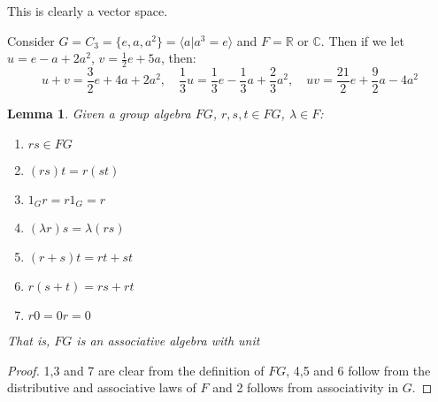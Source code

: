 \documentclass[11pt, notitlepage]{article}
\numberwithin{equation}{section}
\theoremstyle{plain}
\newtheorem{lemma}[theorem]{Lemma}
\theoremstyle{definition}
\newenvironment{example}
	{\pushQED{\qed}\renewcommand{\qedsymbol}{$\blacktriangleleft$}\examplex}
	{\popQED\endexamplex}
\newcommand{\R}{\mathbb{R}}
\newcommand{\C}{\mathbb{C}}
\begin{document}
This is clearly a vector space.

\begin{example}
	Consider $G = C_3 = \{e,a,a^2\} = \langle a|a^3=e\rangle$ and $F=\R$ or $\C$. Then if we let $u = e-a+2a^2$, $v=\frac{1}{2}e+5a$, then:
	\[u+v = \frac{3}{2}e+4a+2a^2,\quad \frac{1}{3}u = \frac{1}{3}e-\frac{1}{3}a+\frac{2}{3}a^2,\quad uv = \frac{21}{2}e+\frac{9}{2}a-4a^2\]
\end{example}
\begin{lemma}\label{le:3.6}
	Given a group algebra $FG$, $r,s,t\in FG$, $\lambda\in F$:
	\begin{enumerate}
		\item $rs\in FG$\\
		\item $(rs)t = r(st)$\\
		\item $1_Gr=r1_G=r$\\
		\item $(\lambda r)s=\lambda(rs)$\\
		\item $(r+s)t=rt+st$\\
		\item $r(s+t)=rs+rt$\\
		\item $r0=0r=0$
	\end{enumerate}
That is, $FG$ is an associative algebra with unit
\end{lemma}
\begin{proof}
	1,3 and 7 are clear from the definition of $FG$, 4,5 and 6 follow from the distributive and associative laws of $F$ and 2 follows from associativity in $G$.
\end{proof}
\end{document}
